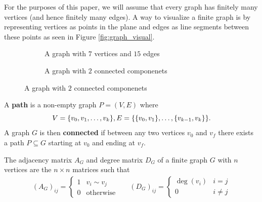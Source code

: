 \documentclass[12pt]{article}
\begin{document}
For the purposes of this paper, we will assume that every graph has finitely many vertices (and hence finitely many edges). A way to visualize a finite graph is by representing vertices as points in the plane and edges as line segments between these points as seen in Figure \ref{fig:graph_visual}.

\begin{figure}[ht]
    \centering
    \caption{Two example graphs in the plane}
    \label{fig:graph_visual}
    \begin{subfigure}[t]{0.45\textwidth}
        \centering
        \caption{A graph with $7$ vertices and $15$ edges}
        \label{fig:basic_graph}
    \end{subfigure}\hfill
    \begin{subfigure}[t]{0.45\textwidth}
        \centering
        \caption{A graph with $2$ connected componenets}
        \label{fig:connected_components}
    \end{subfigure}
\end{figure}

\begin{definition}[Connectedness]
    A \textbf{path} is a non-empty graph $P = (V,E)$ where
    \[
        V = \qty{v_0, v_1, \ldots, v_k}, E = \qty{\qty{v_0,v_1}, \ldots, \qty{v_{k-1}, v_k}}
    .\]
    A graph $G$ is then \textbf{connected} if between any two vertices $v_0$ and $v_f$ there exists a path $P \subseteq G$ starting at $v_0$ and ending at $v_f$.
\end{definition}

\begin{definition}
    The adjacency matrix $A_G$ and degree matrix $D_G$ of a finite graph $G$ with $n$ vertices are the $n \times n$ matrices such that
    \begin{align*}
        (A_G)_{ij} = \begin{cases}
            1 & v_i \sim v_j \\
            0 & \text{otherwise}
        \end{cases} & &
        (D_G)_{ij} = \begin{cases}
            \deg(v_i) & i = j \\
            0 & i \neq j
        \end{cases}
    \end{align*}
\end{definition}
\end{document}
